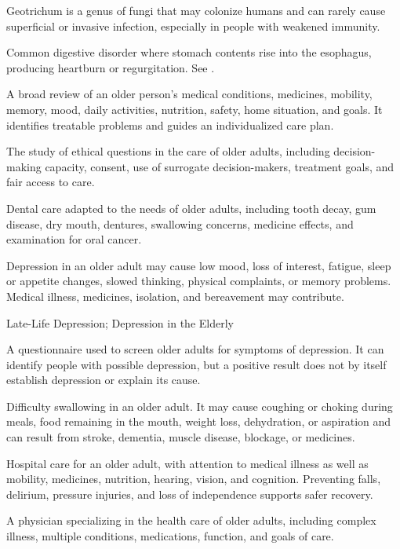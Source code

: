  Geotrichum is a genus of fungi that may colonize humans and can rarely cause superficial or invasive infection, especially in people with weakened immunity.

 Common digestive disorder where stomach contents rise into the esophagus, producing heartburn or regurgitation. See .

 A broad review of an older person’s medical conditions, medicines, mobility, memory, mood, daily activities, nutrition, safety, home situation, and goals. It identifies treatable problems and guides an individualized care plan.

 The study of ethical questions in the care of older adults, including decision-making capacity, consent, use of surrogate decision-makers, treatment goals, and fair access to care.

 Dental care adapted to the needs of older adults, including tooth decay, gum disease, dry mouth, dentures, swallowing concerns, medicine effects, and examination for oral cancer.

 Depression in an older adult may cause low mood, loss of interest, fatigue, sleep or appetite changes, slowed thinking, physical complaints, or memory problems. Medical illness, medicines, isolation, and bereavement may contribute.

\synonyms
Late-Life Depression; Depression in the Elderly

 A questionnaire used to screen older adults for symptoms of depression. It can identify people with possible depression, but a positive result does not by itself establish depression or explain its cause.

 Difficulty swallowing in an older adult. It may cause coughing or choking during meals, food remaining in the mouth, weight loss, dehydration, or aspiration and can result from stroke, dementia, muscle disease, blockage, or medicines.

 Hospital care for an older adult, with attention to medical illness as well as mobility, medicines, nutrition, hearing, vision, and cognition. Preventing falls, delirium, pressure injuries, and loss of independence supports safer recovery.

 A physician specializing in the health care of older adults, including complex illness, multiple conditions, medications, function, and goals of care.

